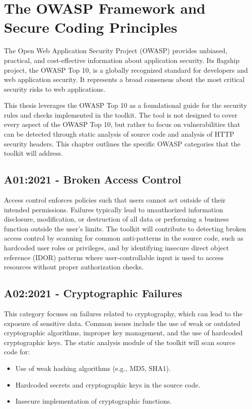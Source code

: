 \chapter{The OWASP Framework and Secure Coding Principles}
\label{chap:owasp}
\setlength{\parskip}{1em}

The Open Web Application Security Project (OWASP) provides unbiased, practical, and cost-effective information about application security. Its flagship project, the OWASP Top 10, is a globally recognized standard for developers and web application security. It represents a broad consensus about the most critical security risks to web applications.

This thesis leverages the OWASP Top 10 as a foundational guide for the security rules and checks implemented in the toolkit. The tool is not designed to cover every aspect of the OWASP Top 10, but rather to focus on vulnerabilities that can be detected through static analysis of source code and analysis of HTTP security headers. This chapter outlines the specific OWASP categories that the toolkit will address.

\section{A01:2021 - Broken Access Control}
Access control enforces policies such that users cannot act outside of their intended permissions. Failures typically lead to unauthorized information disclosure, modification, or destruction of all data or performing a business function outside the user's limits. 
The toolkit will contribute to detecting broken access control by scanning for common anti-patterns in the source code, such as hardcoded user roles or privileges, and by identifying insecure direct object reference (IDOR) patterns where user-controllable input is used to access resources without proper authorization checks.

\section{A02:2021 - Cryptographic Failures}
This category focuses on failures related to cryptography, which can lead to the exposure of sensitive data. Common issues include the use of weak or outdated cryptographic algorithms, improper key management, and the use of hardcoded cryptographic keys.
The static analysis module of the toolkit will scan source code for:
\begin{itemize}
    \item Use of weak hashing algorithms (e.g., MD5, SHA1).
    \item Hardcoded secrets and cryptographic keys in the source code.
    \item Insecure implementation of cryptographic functions.
\end{itemize}


